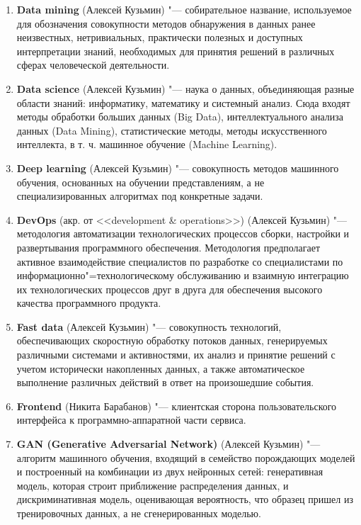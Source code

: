 \documentclass[12pt]{article}
\begin{document}
\begin{enumerate}
    \item \textbf{Data mining} (Алексей Кузьмин) "--- собирательное название, используемое для обозначения совокупности методов обнаружения в данных ранее неизвестных, нетривиальных, практически полезных и доступных интерпретации знаний, необходимых для принятия решений в различных сферах человеческой деятельности.

    \item \textbf{Data science} (Алексей Кузьмин) "--- наука о данных, объединяющая разные области знаний: информатику, математику и системный анализ. Сюда входят
    методы обработки больших данных (Big Data), интеллектуального анализа данных (Data Mining), статистические методы, методы искусственного интеллекта, в т. ч. машинное обучение (Machine Learning).

    \item \textbf{Deep learning} (Алексей Кузьмин) "---  совокупность методов машинного обучения, основанных на обучении представлениям, а не специализированных алгоритмах под конкретные задачи.

    \item \textbf{DevOps} (акр. от <<development \& operations>>) (Алексей Кузьмин) "--- методология автоматизации технологических процессов сборки, настройки и развертывания программного обеспечения. Методология предполагает активное взаимодействие специалистов по разработке со специалистами по информационно"=технологическому обслуживанию и взаимную интеграцию их технологических процессов друг в друга для обеспечения высокого качества
    программного продукта.

    \item \textbf{Fast data} (Алексей Кузьмин) "--- совокупность технологий, обеспечивающих скоростную обработку потоков данных, генерируемых различными системами и активностями, их анализ и принятие решений с учетом исторически накопленных данных, а также автоматическое выполнение различных действий в ответ на произошедшие события.

    \item \textbf{Frontend} (Никита Барабанов) "--- клиентская сторона пользовательского интерфейса к программно-аппаратной части сервиса.
    
    \item \textbf{GAN (Generative Adversarial Network)} (Алексей Кузьмин) "--- алгоритм машинного обучения, входящий в семейство порождающих моделей и построенный на комбинации из двух нейронных сетей: генеративная модель, которая строит приближение распределения данных, и дискриминативная модель, оценивающая вероятность, что образец пришел из тренировочных данных, а не сгенерированных моделью.


\end{enumerate}
\end{document}

